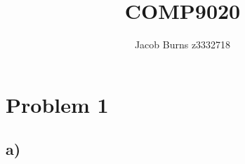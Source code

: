 \documentclass{article}
\begin{document}
\title{COMP9020}
\author{Jacob Burns z3332718}
\date{} %
\maketitle %


\section*{Problem 1} 

\subsection*{a)}
\end{document}
